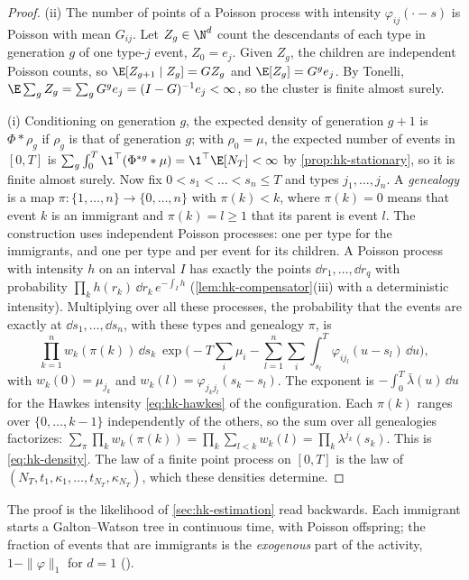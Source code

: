 \begin{proof}
(ii) The number of points of a Poisson process with intensity $\varphi_{ij}(\cdot-s)$ is Poisson with mean
$G_{ij}$. Let $Z_g\in\N^d$ count the descendants of each type in generation $g$ of one type-$j$ event, $Z_0=e_j$.
Given $Z_g$, the children are independent Poisson counts, so $\E[Z_{g+1}\mid Z_g]=GZ_g$ and $\E[Z_g]=G^ge_j$.
By Tonelli, $\E\sum_gZ_g=\sum_gG^ge_j=(I-G)^{-1}e_j<\infty$, so the cluster is finite almost surely.

(i) Conditioning on generation $g$, the expected density of generation $g+1$ is $\Phi*\rho_g$ if $\rho_g$ is that
of generation $g$; with $\rho_0=\mu$, the expected number of events in $[0,T]$ is
$\sum_g\int_0^T\1^\top(\Phi^{*g}*\mu)=\1^\top\E[N_T]<\infty$ by \cref{prop:hk-stationary}, so it is finite almost
surely. Now fix $0<s_1<\dots<s_n\le T$ and types $j_1,\dots,j_n$. A \emph{genealogy} is a map
$\pi:\{1,\dots,n\}\to\{0,\dots,n\}$ with $\pi(k)<k$, where $\pi(k)=0$ means that event $k$ is an immigrant and
$\pi(k)=l\ge1$ that its parent is event $l$. The construction uses independent Poisson processes: one per type
for the immigrants, and one per type and per event for its children. A Poisson process with intensity $h$ on an
interval $I$ has exactly the points $\dd r_1,\dots,\dd r_q$ with probability $\prod_kh(r_k)\,\dd r_k\,e^{-\int_Ih}$
(\cref{lem:hk-compensator}(iii) with a deterministic intensity). Multiplying over all these processes, the
probability that the events are exactly at $\dd s_1,\dots,\dd s_n$, with these types and genealogy $\pi$, is
\[
  \prod_{k=1}^nw_k(\pi(k))\,\dd s_k\ \exp\Big(-T\sum_i\mu_i-\sum_{l=1}^n\sum_i\int_{s_l}^T\varphi_{ij_l}(u-s_l)\,\dd u\Big),
\]
with $w_k(0)=\mu_{j_k}$ and $w_k(l)=\varphi_{j_kj_l}(s_k-s_l)$. The exponent is $-\int_0^T\bar\lambda(u)\,\dd u$ for
the Hawkes intensity \eqref{eq:hk-hawkes} of the configuration. Each $\pi(k)$ ranges over $\{0,\dots,k-1\}$
independently of the others, so the sum over all genealogies factorizes:
$\sum_\pi\prod_kw_k(\pi(k))=\prod_k\sum_{l<k}w_k(l)=\prod_k\lambda^{j_k}(s_k)$. This is \eqref{eq:hk-density}.
The law of a finite point process on $[0,T]$ is the law of $(N_T,t_1,\kappa_1,\dots,t_{N_T},\kappa_{N_T})$, which
these densities determine.
\end{proof}

The proof is the likelihood of \cref{sec:hk-estimation} read backwards. Each immigrant starts a Galton--Watson
tree in continuous time, with Poisson offspring; the fraction of events that are immigrants is the
\emph{exogenous} part of the activity, $1-\|\varphi\|_1$ for $d=1$ ().

